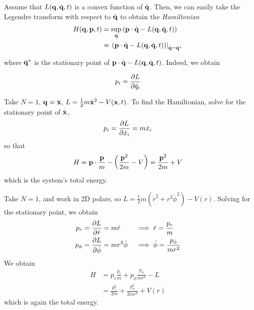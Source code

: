 \documentclass{../../template/note}
\begin{document}
    Assume that $L(\V q, \dot{\V q}, t)$ is a convex function of $\dot{\V q}$. Then, we can easily take the Legendre transform with respect to $\dot{\V q}$ to obtain the \emph{Hamiltonian}
    \begin{align*}
        H(\V q, \V p, t) &= \sup_{\dot{\V q}} \left(\V p \cdot \dot{\V q} - L(\V q, \dot{\V q}, t)\right) \\
        &= \left.\left(\V p \cdot \dot{\V q} - L(\V q, \dot{\V q}, t)\right)\right|_{\dot{\V q} = \dot{\V q}^*}
    \end{align*}
    
    where $\dot{\V q}^*$ is the stationary point of $\V p \cdot \dot{\V q} - L(\V q, \dot{\V q}, t)$. Indeed, we obtain

    \begin{proposition}
        \label{min-crit}
        \[
            p_i = \pd{L}{\dot q_i}
        \]
    \end{proposition}
    
    
    
    \begin{example*}
        Take $N=1$, $\V q = \V x$, $L = \frac 1 2 m \dot{\V x}^2 - V(\V x, t)$. To find the Hamiltonian, solve for the stationary point of $\dot{\V x}$,
        \begin{align*}
            p_i = \pd{L}{\dot x_i} = m \dot x_i
        \end{align*}
        so that
        \begin{align*}
            H = \V p \cdot \frac{\V p}{m} - \left(\frac{\V p^2}{2m} - V\right) = \frac{\V p^2}{2m} + V
        \end{align*}
        which is the system's total energy.       
    \end{example*}
    
    \begin{example*}
        Take $N=1$, and work in 2D polars, so $L = \frac 1 2 m(\dot r^2 + r^2 \dot \phi^2) - V(r)$. Solving for the stationary point, we obtain
        \begin{align*}
            p_r &= \pd{L}{\dot r} = m \dot r && \implies \dot r = \frac{p_r}{m} \\
            p_\phi &= \pd{L}{\dot \phi} = mr^2 \dot \phi && \implies \dot \phi = \frac{p_\phi}{mr^2}
        \end{align*}
        We obtain
        \begin{align*}
            H &= p_r \frac{p_r}{m} + p_\phi \frac{p_\phi}{mr^2} - L \\
            &= \frac{p_r^2}{2m} + \frac{p_\phi^2}{2mr^2} + V(r)
        \end{align*}
        which is again the total energy.       
    \end{example*}
    
\end{document}
